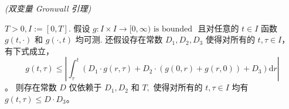 \begin{lemma}\textit{(双变量 Gronwall 引理)}
\label{lem:bivariant-Gronwall}


 $T>0, I:=[0, T]$. 假设 $g: I \times I \rightarrow[0, \infty) \text { is bounded }$ 且对任意的 $t \in I$ 函数 $g(t, \cdot)$ 和 $g(\cdot, t)$ 均可测. 还假设存在常数 $D_{1}, D_{2}, D_{3}$ 使得对所有的 $t, \tau \in I$， 有下式成立，
$$g(t, \tau) \leqslant\left|\int_{\tau}^{t}\left(D_{1} \cdot g(r, \tau)+D_{2} \cdot(g(0, r)+g(r, 0))+D_{3}\right) \mathrm{d} r\right|$$。
则存在常数 $D$ 仅依赖于  $D_{1}, D_{2}$ 和 $T,$ 使得对所有的 $t, \tau \in I$ 均有 $g(t, \tau) \leqslant D \cdot D_{3}$。

\end{lemma}


